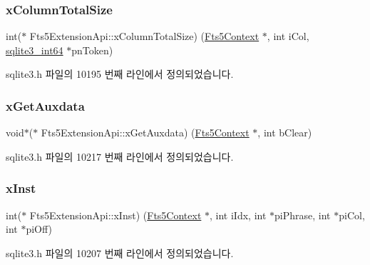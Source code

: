 \subsubsection{\texorpdfstring{x\+Column\+Total\+Size}{xColumnTotalSize}}
{\footnotesize\ttfamily int($\ast$ Fts5\+Extension\+Api\+::x\+Column\+Total\+Size) (\hyperlink{sqlite3_8h_a97821b95ebebd43db901977ffd5b26bc}{Fts5\+Context} $\ast$, int i\+Col, \hyperlink{sqlite3_8h_a0a4d3e6c1ad46f90e746b920ab6ca0d2}{sqlite3\+\_\+int64} $\ast$pn\+Token)}



sqlite3.\+h 파일의 10195 번째 라인에서 정의되었습니다.

\mbox{\label{struct_fts5_extension_api_a63ba9aaf30fe9fe5fbcd1541ff38abff}} 
\subsubsection{\texorpdfstring{x\+Get\+Auxdata}{xGetAuxdata}}
{\footnotesize\ttfamily void$\ast$($\ast$ Fts5\+Extension\+Api\+::x\+Get\+Auxdata) (\hyperlink{sqlite3_8h_a97821b95ebebd43db901977ffd5b26bc}{Fts5\+Context} $\ast$, int b\+Clear)}



sqlite3.\+h 파일의 10217 번째 라인에서 정의되었습니다.

\mbox{\label{struct_fts5_extension_api_a85e17f20db782b20b503f1d803a47a9e}} 
\subsubsection{\texorpdfstring{x\+Inst}{xInst}}
{\footnotesize\ttfamily int($\ast$ Fts5\+Extension\+Api\+::x\+Inst) (\hyperlink{sqlite3_8h_a97821b95ebebd43db901977ffd5b26bc}{Fts5\+Context} $\ast$, int i\+Idx, int $\ast$pi\+Phrase, int $\ast$pi\+Col, int $\ast$pi\+Off)}



sqlite3.\+h 파일의 10207 번째 라인에서 정의되었습니다.

\mbox{\label{struct_fts5_extension_api_af57aff7a8aa8402bb37a77892c4daf45}} 
